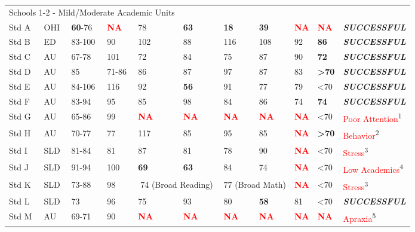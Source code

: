 \documentclass[twoside]{article}
\begin{document}
\begin{tiny}
\begin{landscape}
\begin{longtable}{p{1.5cm}p{1.5cm}p{1.5cm}p{1.5cm}p{1.75cm}p{1.75cm}p{1.75cm}p{1.75cm}p{1.75cm}p{1.75cm}p{2.5cm}@{}}
\multicolumn {5}{l}{Schools 1-2 - Mild/Moderate Academic Units}& & & & & &\\
\cmidrule(lr){1-2}
Std A & OHI & \textbf{60}-76 & \textcolor{red}{\textbf{NA}} & 78 & \textbf{63} & \textbf{18} & \textbf{39} & \textcolor{red}{\textbf{NA}} & \textcolor{red}{\textbf{NA}} & \textbf{\textit{SUCCESSFUL}}\\
Std B & ED & 83-100 & 90 & 102 & 88 & 116 & 108 & 92 & \textbf{86} & \textbf{\textit{SUCCESSFUL}}\\
Std C & AU & 67-78 & 101 & 72 & 84 & 75 & 87 & 90 & \textbf{72} & \textbf{\textit{SUCCESSFUL}}\\
Std D & AU & 85 & 71-86 & 86 & 87 & 97 & 87 & 83 & \textbf{\textgreater70} & \textbf{\textit{SUCCESSFUL}}\\
Std E & AU & 84-106 & 116 & 92 & \textbf{56} & 91 & 77 & 79 & \textless70 & \textbf{\textit{SUCCESSFUL}}\\
Std F & AU & 83-94 & 95 & 85 & 98 & 84 & 86 & 74 & \textbf{74} & \textbf{\textit{SUCCESSFUL}}\\
Std G & AU & 65-86 & 99 & \textcolor{red}{\textbf{NA}} & \textcolor{red}{\textbf{NA}} & \textcolor{red}{\textbf{NA}} & \textcolor{red}{\textbf{NA}} & \textcolor{red}{\textbf{NA}} & \textless70 & \textcolor{red}{Poor Attention}\textsuperscript{1}\\
Std H & AU & 70-77 & 77 & 117 & 85 & 95 & 85 & \textcolor{red}{\textbf{NA}} & \textbf{\textgreater70} & \textcolor{red}{Behavior}\textsuperscript{2}\\
Std I & SLD & 81-84 & 81 & 87 & 81 & 78 & 90 & \textcolor{red}{\textbf{NA}} & \textless70 & \textcolor{red}{Stress}\textsuperscript{3}\\
Std J & SLD & 91-94 & 100 & \textbf{69} & \textbf{63} & 84 & 74 & \textcolor{red}{\textbf{NA}} & \textless70 & \textcolor{red}{Low Academics}\textsuperscript{4}\\
Std K & SLD & 73-88 & 98 & \multicolumn{2}{c}{74 (Broad Reading)} & \multicolumn {2}{c}{77 (Broad Math)} & \textcolor{red}{\textbf{NA}} & \textless70 & \textcolor{red}{Stress}\textsuperscript{3}\\
Std L & SLD & 73 & 96 & 75 & 93 & 80 & \textbf{58} & 81 & \textless70 & \textbf{\textit{SUCCESSFUL}}\\
Std M & AU & 69-71 & 90 & \textcolor{red}{\textbf{NA}} & \textcolor{red}{\textbf{NA}} & \textcolor{red}{\textbf{NA}} & \textcolor{red}{\textbf{NA}} & \textcolor{red}{\textbf{NA}} & \textcolor{red}{\textbf{NA}} & \textcolor{red}{Apraxia}\textsuperscript{5}\\

\end{longtable}
\end{landscape}
\end{tiny}
\end{document}
